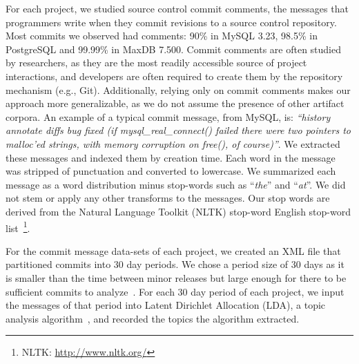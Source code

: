 \documentclass[smallextended]{svjour3}       %
\begin{document}
For each project, we studied source control commit comments, the messages
that programmers write when they commit revisions to a source control
repository. 
Most commits we observed had comments: 90\% in MySQL 3.23,
98.5\% in PostgreSQL and 99.99\% in MaxDB 7.500.
Commit comments are often studied by researchers, as they are the most readily accessible source of project interactions, and developers are often
required to create them by the repository mechanism (e.g., Git).  Additionally, relying only on commit comments makes our approach more generalizable,
as we do not assume the presence of other artifact corpora.
An example of a typical commit message, from MySQL, is: \textit{``history annotate diffs bug fixed (if mysql\-\_real\-\_connect() failed there were
two pointers to malloc'ed strings, with memory corruption on free(), of course)''}. 
We extracted these messages and indexed them by creation time. 
Each word in the message was
stripped of punctuation and converted to lowercase.
We summarized each message as a word distribution minus stop-words
such as ``\emph{the}'' and ``\emph{at}''. We did not stem or apply any
other transforms to the messages.
Our stop words are derived from the Natural Language Toolkit (NLTK) stop-word English stop-word
list~\footnote{NLTK: \url{http://www.nltk.org/}}.


For the commit message data-sets of each project, we created an XML file that partitioned commits into 30 day periods. 
We chose a period size of 30 days as it is smaller than the time between minor releases but large enough for there to be sufficient commits to
analyze~\cite{Hindle09ICSM}. 
For each 30 day period of each project, we input the messages of that period into Latent Dirichlet Allocation (LDA), a topic analysis
algorithm~\cite{Blei2003}, and recorded the topics the algorithm extracted.
\end{document}
